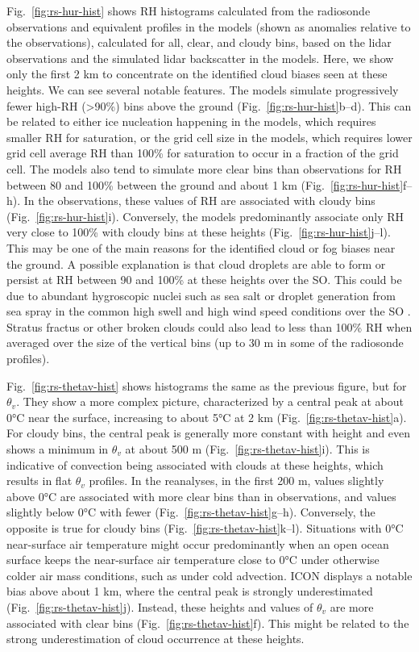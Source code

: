 \documentclass[draft]{agujournal2019}
\begin{document}
Fig.~\ref{fig:rs-hur-hist} shows RH histograms calculated from the radiosonde observations and equivalent profiles in the models (shown as anomalies relative to the observations), calculated for all, clear, and cloudy bins, based on the lidar observations and the simulated lidar backscatter in the models. Here, we show only the first 2 km to concentrate on the identified cloud biases seen at these heights. We can see several notable features. The models simulate progressively fewer high-RH (\textgreater 90\%) bins above the ground (Fig.~\ref{fig:rs-hur-hist}b–d). This can be related to either ice nucleation happening in the models, which requires smaller RH for saturation, or the grid cell size in the models, which requires lower grid cell average RH than 100\% for saturation to occur in a fraction of the grid cell. The models also tend to simulate more clear bins than observations for RH between 80 and 100\% between the ground and about 1 km (Fig.~\ref{fig:rs-hur-hist}f–h). In the observations, these values of RH are associated with cloudy bins (Fig.~\ref{fig:rs-hur-hist}i). Conversely, the models predominantly associate only RH very close to 100\% with cloudy bins at these heights (Fig.~\ref{fig:rs-hur-hist}j–l). This may be one of the main reasons for the identified cloud or fog biases near the ground. A possible explanation is that cloud droplets are able to form or persist at RH between 90 and 100\% at these heights over the SO. This could be due to abundant hygroscopic nuclei such as sea salt \cite{zieger2017,kong2018} or droplet generation from sea spray in the common high swell and high wind speed conditions over the SO \cite{revell2019,hartery2020}. Stratus fractus or other broken clouds could also lead to less than 100\% RH when averaged over the size of the vertical bins (up to 30 m in some of the radiosonde profiles).

Fig.~\ref{fig:rs-thetav-hist} shows histograms the same as the previous figure, but for $\theta_v$. They show a more complex picture, characterized by a central peak at about 0°C near the surface, increasing to about 5°C at 2 km (Fig.~\ref{fig:rs-thetav-hist}a). For cloudy bins, the central peak is generally more constant with height and even shows a minimum in $\theta_v$ at about 500 m (Fig.~\ref{fig:rs-thetav-hist}i). This is indicative of convection being associated with clouds at these heights, which results in flat $\theta_v$ profiles. In the reanalyses, in the first 200 m, values slightly above 0°C are associated with more clear bins than in observations, and values slightly below 0°C with fewer (Fig.~\ref{fig:rs-thetav-hist}g–h). Conversely, the opposite is true for cloudy bins (Fig.~\ref{fig:rs-thetav-hist}k–l). Situations with 0°C near-surface air temperature might occur predominantly when an open ocean surface keeps the near-surface air temperature close to 0°C under otherwise colder air mass conditions, such as under cold advection. ICON displays a notable bias above about 1 km, where the central peak is strongly underestimated (Fig.~\ref{fig:rs-thetav-hist}j). Instead, these heights and values of $\theta_v$ are more associated with clear bins (Fig.~\ref{fig:rs-thetav-hist}f). This might be related to the strong underestimation of cloud occurrence at these heights.
\end{document}
